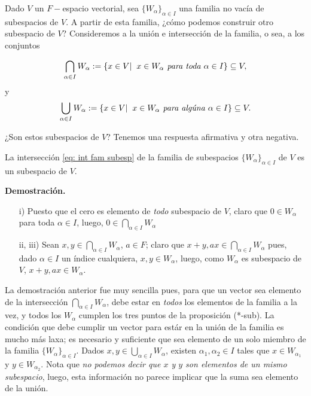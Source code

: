 Dado $V$ un $F-$espacio vectorial, 
sea $\{ W_{\alpha} \}_{\alpha \in I}$ una familia no vacía de subespacios
de $V$. A partir de esta familia, ¿cómo podemos construir otro
subespacio de $V$?
Consideremos a la unión e intersección de la familia, o sea,
a los conjuntos

\begin{equation}
	\label{eq: int fam subesp}
	\bigcap_{\alpha \in I} W_{\alpha} :=
\{ x \in V  | \hspace{0.2cm} x \in W_{\alpha} \textit{ para toda }
\alpha \in I  \} \subseteq V,
\end{equation}
y
\begin{equation}
	\label{eq: union fam subesp}
	\bigcup_{\alpha \in I} W_{\alpha} :=
\{ x \in V  | \hspace{0.2cm} x \in W_{\alpha} \textit{ para algúna }
\alpha \in I  \} \subseteq V.
\end{equation}

¿Son estos subespacios de $V$?
Tenemos una
respuesta afirmativa y otra negativa.

\begin{prop}
La intersección \eqref{eq: int fam subesp} de la familia
de subespacios $\{ W_{\alpha} \}_{\alpha \in I}$
de $V$ es un subespacio de $V$.
\end{prop}
\noindent
\textbf{Demostración.}
\begin{itemize}
	\item[i)] Puesto que el cero es elemento de \textit{todo}
	subespacio de $V$, claro que $0 \in W_{\alpha}$ para
	toda $\alpha \in I$, luego, $0 \in \bigcap_{\alpha \in I} W_{\alpha}$
	\item[ii, iii)] Sean $x, y \in \bigcap_{\alpha \in I} W_{\alpha}$,
	$a \in F$; claro que 
	$x+y, ax \in \bigcap_{\alpha \in I} W_{\alpha}$
	pues, dado $\alpha \in I$ un índice cualquiera,
	$x, y \in W_{\alpha}$, luego, como 
	$W_{\alpha}$ es subespacio de $V$, $x+y, ax \in W_{\alpha}$.
\end{itemize}

\QEDB
\vspace{0.2cm}

La demostración anterior fue muy sencilla pues, para
que un vector sea elemento de la intersección
$\bigcap_{\alpha \in I} W_{\alpha}$,
debe estar en \textit{todos} los elementos de la familia a la 
vez, y todos los $W_{\alpha}$ cumplen  
los tres puntos de la proposición (*-sub).
La condición que debe cumplir un vector para estár en la 
unión de la familia es mucho más laxa; es necesario y suficiente
que sea elemento de un solo miembro de la familia
$\{ W_{\alpha} \}_{\alpha \in I}$.
Dados
$x, y \in \bigcup_{\alpha \in I} W_{\alpha}$,
existen $\alpha_{1}, \alpha_{2} \in I$
tales que $x \in W_{\alpha_{1}}$ y 
$y \in W_{\alpha_{2}}$. Nota que \textit{no podemos
decir que $x$ y $y$ son elementos de un mismo subespacio}, luego,
esta información no parece implicar que la suma sea elemento de la 
unión.



